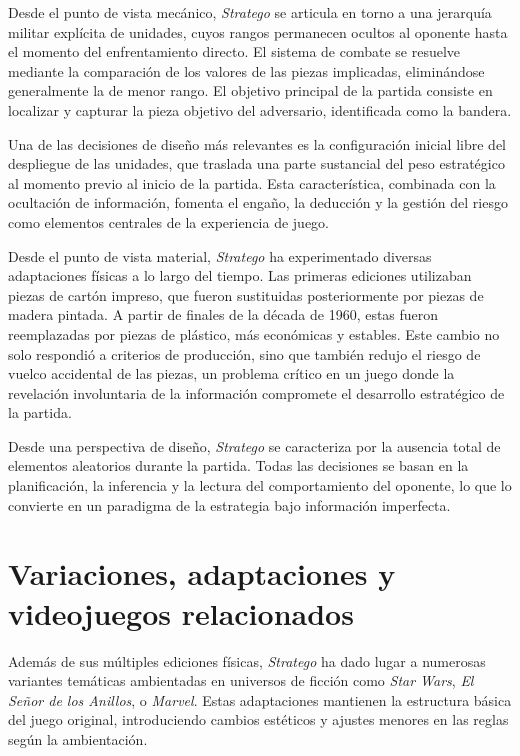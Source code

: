Desde el punto de vista mecánico, \textit{Stratego} se articula en torno a una jerarquía militar explícita de unidades, cuyos rangos permanecen ocultos al oponente hasta el momento del enfrentamiento directo. El sistema de combate se resuelve mediante la comparación de los valores de las piezas implicadas, eliminándose generalmente la de menor rango. El objetivo principal de la partida consiste en localizar y capturar la pieza objetivo del adversario, identificada como la bandera.

Una de las decisiones de diseño más relevantes es la configuración inicial libre del despliegue de las unidades, que traslada una parte sustancial del peso estratégico al momento previo al inicio de la partida. Esta característica, combinada con la ocultación de información, fomenta el engaño, la deducción y la gestión del riesgo como elementos centrales de la experiencia de juego.

Desde el punto de vista material, \textit{Stratego} ha experimentado diversas adaptaciones físicas a lo largo del tiempo. Las primeras ediciones utilizaban piezas de cartón impreso, que fueron sustituidas posteriormente por piezas de madera pintada. A partir de finales de la década de 1960, estas fueron reemplazadas por piezas de plástico, más económicas y estables. Este cambio no solo respondió a criterios de producción, sino que también redujo el riesgo de vuelco accidental de las piezas, un problema crítico en un juego donde la revelación involuntaria de la información compromete el desarrollo estratégico de la partida.

Desde una perspectiva de diseño, \textit{Stratego} se caracteriza por la ausencia total de elementos aleatorios durante la partida. Todas las decisiones se basan en la planificación, la inferencia y la lectura del comportamiento del oponente, lo que lo convierte en un paradigma de la estrategia bajo información imperfecta.

\clearpage
\section{Variaciones, adaptaciones y videojuegos relacionados}

Además de sus múltiples ediciones físicas, \textit{Stratego} ha dado lugar a numerosas variantes temáticas ambientadas en universos de ficción como \textit{Star Wars}, \textit{El Señor de los Anillos}, o \textit{Marvel}. Estas adaptaciones mantienen la estructura básica del juego original, introduciendo cambios estéticos y ajustes menores en las reglas según la ambientación.

